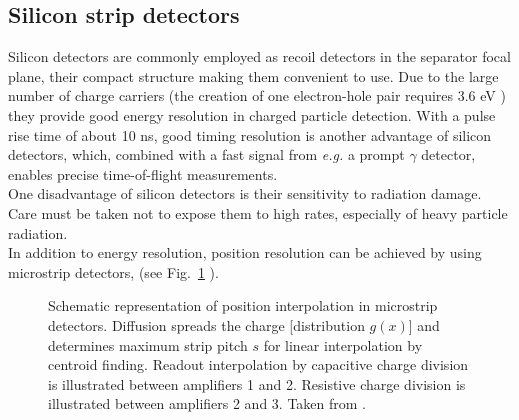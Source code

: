 \subsection{Silicon strip detectors}
Silicon detectors are commonly employed as recoil detectors in the separator focal plane, their compact structure making them convenient to use. Due to the large number of charge carriers (the creation of one electron-hole pair requires 3.6 eV \cite{kemm88}) they provide good energy resolution in charged particle detection. With a pulse rise time of about 10 ns, good timing resolution is another advantage of silicon detectors, which, combined with a fast signal from {\it e.g.} a prompt $\gamma$ detector, enables precise time-of-flight measurements. \\
One disadvantage of silicon detectors is their sensitivity to radiation damage. Care must be taken not to expose them to high rates, especially of heavy particle radiation.\\
In addition to energy resolution, position resolution can be achieved by using microstrip detectors, (see Fig.\ \ref{fig:microstrip} \cite{rade84}).
%
\begin{figure}
\centering
{}
\caption{Schematic representation of position interpolation in microstrip detectors. Diffusion spreads the charge [distribution $g(x)$] and determines maximum strip pitch $s$ for linear interpolation by centroid finding. Readout interpolation by capacitive charge division is illustrated between amplifiers 1 and 2. Resistive charge division is illustrated between amplifiers 2 and 3. Taken from \cite{rade84}.}
\label{fig:microstrip}
\end{figure}
